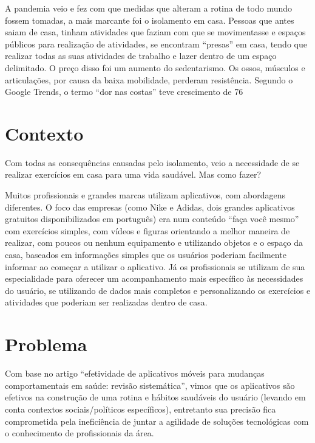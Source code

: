 \documentclass[conference]{IEEEtran}
\begin{document}
A pandemia veio e fez com que medidas que alteram a rotina de todo mundo fossem tomadas, a mais marcante foi o isolamento em casa. Pessoas que antes saiam de casa, tinham atividades que faziam com que se movimentasse e espaços públicos para realização de atividades, se encontram “presas” em casa, tendo que realizar todas as suas atividades de trabalho e lazer dentro de um espaço delimitado. O preço disso foi um aumento do sedentarismo. Os ossos, músculos e articulações, por causa da baixa mobilidade, perderam resistência. Segundo o Google Trends, o termo “dor nas costas” teve crescimento de 76%

\section{Contexto}

Com todas as consequências causadas pelo isolamento, veio a necessidade de se realizar exercícios em casa para uma vida saudável. Mas como fazer?

Muitos profissionais e grandes marcas utilizam aplicativos, com abordagens diferentes. O foco das empresas (como Nike e Adidas, dois grandes aplicativos gratuitos disponibilizados em português) era num conteúdo “faça você mesmo” com exercícios simples, com vídeos e figuras orientando a melhor maneira de realizar, com poucos ou nenhum equipamento e utilizando objetos e o espaço da casa, baseados em informações simples que os usuários poderiam facilmente informar ao começar a utilizar o aplicativo. Já os profissionais se utilizam de sua especialidade para oferecer um acompanhamento mais específico às necessidades do usuário, se utilizando de dados mais completos e personalizando os exercícios e atividades que poderiam ser realizadas dentro de casa.


\section{Problema}
Com base no artigo “efetividade de aplicativos móveis para mudanças comportamentais em saúde: revisão sistemática”, vimos que os aplicativos são efetivos na construção de uma rotina e hábitos saudáveis do usuário (levando em conta contextos sociais/políticos específicos), entretanto sua precisão fica comprometida pela ineficiência de juntar a agilidade de soluções tecnológicas com o conhecimento de profissionais da área.
\end{document}
